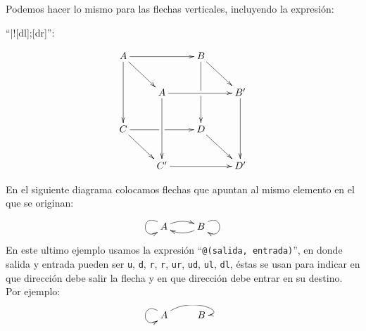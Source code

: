 \documentclass[letterpaper,12pt]{article}
\begin{document}
\bigskip

Podemos hacer lo mismo para las flechas verticales, incluyendo la expresión:

``\verb@|!{[dl];[dr]}\hole@'':

\bigskip

\begin{equation*}
\xymatrix {
    A \ar[rr] \ar[dd] \ar[dr] && B \ar[dr] \ar[dd] |!{[dl];[dr]}\hole \\
    & A \ar[rr] \ar[dd] && B' \ar[dd] \\
    C \ar[rr] |!{[ur];[dr]}\hole \ar[dr] && D \ar[rd] \\
    & C' \ar[rr] && D' \\
  }    
\end{equation*}

\bigskip

En el siguiente diagrama colocamos flechas que apuntan al mismo elemento en el que se originan:

\bigskip

\begin{equation*}
\xymatrix{
    A \ar@(ul,dl)[] \ar@/^/[r] & 
    B \ar@(ur,dr)[] \ar@/^/[l] 
}
\end{equation*}
 
\bigskip

En este ultimo ejemplo usamos la expresión ``\texttt{@(salida, entrada)}'', en donde salida y entrada pueden ser \texttt{u}, \texttt{d}, \texttt{r}, \texttt{r}, \texttt{ur}, \texttt{ud}, \texttt{ul}, \texttt{dl}, éstas se usan para indicar en que dirección debe salir la flecha y en que dirección debe entrar en su destino. Por ejemplo:

\bigskip

\begin{equation*}
\xymatrix{A\ar@(ul,dl)[]\ar@(ur,r)[r] &B}
\end{equation*}
\end{document}
